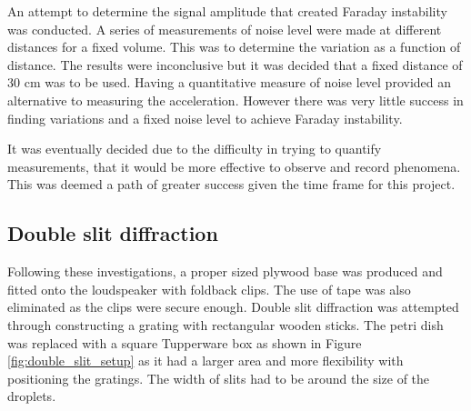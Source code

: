 An attempt to determine the signal amplitude that created Faraday instability was conducted. A series of measurements of noise level were made at different distances for a fixed volume. This was to determine the variation as a function of distance. The results were inconclusive but it was decided that a fixed distance of 30 cm was to be used. Having a quantitative measure of noise level provided an alternative to measuring the acceleration. However there was very little success in finding variations and a fixed noise level to achieve Faraday instability.

It was eventually decided due to the difficulty in trying to quantify measurements, that it would be more effective to observe and record phenomena. This was deemed a path of greater success given the time frame for this project.

\subsection{Double slit diffraction}
Following these investigations, a proper sized plywood base was produced and fitted onto the loudspeaker with foldback clips. The use of tape was also eliminated as the clips were secure enough. Double slit diffraction was attempted through constructing a grating with rectangular wooden sticks. The petri dish was replaced with a square Tupperware box as shown in Figure \ref{fig:double_slit_setup} as it had a larger area and more flexibility with positioning the gratings. The width of slits had to be around the size of the droplets.

